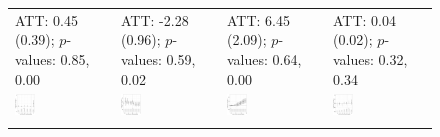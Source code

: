 \documentclass[12pt]{article}
\begin{document}
\begin{figure}[!ht]
\begin{minipage}{1\linewidth}
{{\begin{tabular}{C{3.8cm}C{3.8cm}C{3.8cm}C{3.8cm}}
   \citet{Kogan2021} \newline  ATT: 0.45 (0.39); \newline $p$-values: 0.85, 0.00 & 
   \citet{magaloni2020killing} \newline  ATT: -2.28 (0.96); \newline $p$-values: 0.59, 0.02 &
   \citet{Paglayan2022} \newline  ATT: 6.45 (2.09); \newline $p$-values: 0.64, 0.00  &
    \citet{Payson2020apsr} \newline  ATT: 0.04 (0.02); \newline $p$-values: 0.32, 0.34\\
   \hspace{-2em} \includegraphics[width = 0.22\textwidth]{figure/fect/kogan_fect_entry.png}  & 
   \hspace{-2em}  \includegraphics[width = 0.22\textwidth]{figure/fect/magaloni_fect_entry.png} &
   \hspace{-2em}  \includegraphics[width = 0.22\textwidth]{figure/fect/paglayan_fect_entry.png} &
      \hspace{-2em} \includegraphics[width = 0.22\textwidth]{figure/fect/paysona_fect_entry.png}\\ \\ 

\end{tabular}}}
\end{minipage}
\end{figure}
\end{document}
